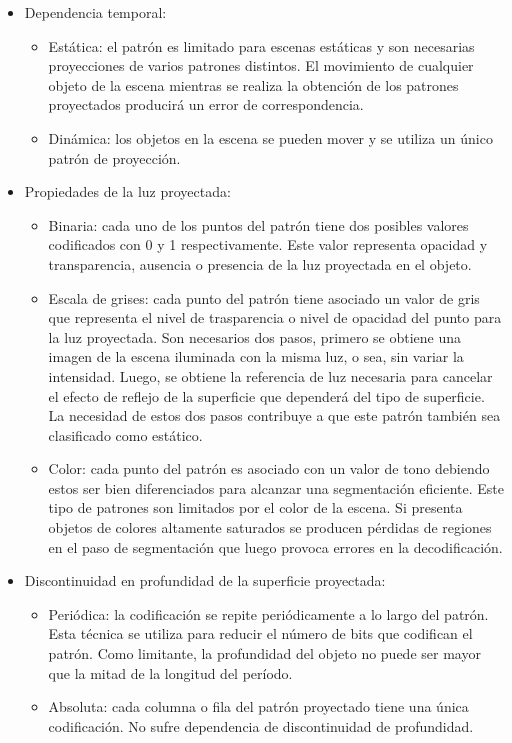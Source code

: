 \begin{itemize}
   \item Dependencia  temporal:
   \begin{itemize}
	\item Estática: el patrón es limitado para escenas estáticas y son necesarias proyecciones de varios patrones distintos. El movimiento de cualquier objeto de la escena mientras se realiza la obtención de los patrones proyectados producirá un error de correspondencia.
	\item Dinámica: los objetos en la escena se pueden mover y se utiliza un único patrón de proyección.
   \end{itemize}
   \item Propiedades de la luz proyectada:
   \begin{itemize}
	\item Binaria: cada uno de los puntos del patrón tiene dos posibles valores codificados con 0 y 1 respectivamente. Este valor representa opacidad y transparencia, ausencia o presencia de la luz proyectada en el objeto.
	\item Escala de grises: cada punto del patrón tiene asociado un valor de gris que representa el nivel de trasparencia o nivel de opacidad del punto para la luz proyectada. Son necesarios dos pasos, primero se obtiene una imagen de la escena iluminada con la misma luz, o sea, sin variar la intensidad. Luego, se obtiene la referencia de luz necesaria para cancelar el efecto de reflejo de la superficie que dependerá del tipo de superficie. La necesidad de estos dos pasos contribuye a que este patrón también sea clasificado como estático.
	\item Color: cada punto del patrón es asociado con un valor de tono debiendo estos ser bien diferenciados para alcanzar una segmentación eficiente. Este tipo de patrones son limitados por el color de la escena. Si presenta objetos de colores altamente saturados se producen pérdidas de regiones en el paso de segmentación que luego provoca errores en la decodificación.
   \end{itemize}
   \item Discontinuidad en profundidad de la superficie proyectada:
   \begin{itemize}
	\item Periódica: la codificación se repite periódicamente a lo largo del patrón. Esta técnica se utiliza para reducir el número de bits que codifican el patrón. Como limitante, la profundidad del objeto no puede ser mayor que la mitad de la longitud del período.%
	\item Absoluta: cada columna o fila del patrón proyectado tiene una única codificación. No sufre dependencia de discontinuidad de profundidad.
   \end{itemize}
\end{itemize}

